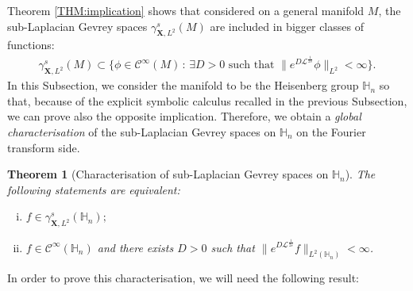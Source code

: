 \documentclass[12pt,oneside,a4paper]{book}
\numberwithin{equation}{section}     %
\theoremstyle{plain}
\newtheorem{theorem}{Theorem}[section]
\theoremstyle{definition}
\newcommand{\slp}{{\mathcal L}}
\begin{document}
Theorem \ref{THM:implication} shows that considered on a general manifold $M$, the sub-Laplacian Gevrey spaces $\gamma^s_{\mathbf{X},L^2}(M)$ are included in bigger classes of functions:
\begin{align*}
\gamma^s_{\mathbf{X},L^2}(M)\subset\big\{\phi\in\mathcal C^\infty(M)\,:\,\exists D>0\text{ such that }\|e^{D\slp^{\frac{1}{2s}}}\phi\|_{L^2}<\infty\big\}.
\end{align*}
In this Subsection, we consider the manifold to be the Heisenberg group $\mathbb H_n$ so that, because of the explicit symbolic calculus recalled in the previous Subsection, we can prove also the opposite implication. Therefore, we obtain a \textit{global characterisation} of the sub-Laplacian Gevrey spaces on $\mathbb H_n$ on the Fourier transform side.

\begin{theorem}[Characterisation of sub-Laplacian Gevrey spaces on $\mathbb H_n$]
	\label{THM:Heis}
	The following statements are equivalent:
	\begin{enumerate}[i.]
		\item $f\in \gamma^s_{\mathbf{X},L^2}(\mathbb H_n);$
		\item $f\in\mathcal C^\infty (\mathbb H_n)$ and there exists $D>0$ such that $\|e^{D\slp^{\frac{1}{2s}}} f\|_{L^2(\mathbb H_n)}<\infty$.
	\end{enumerate}
\end{theorem}

In order to prove this characterisation, we will need the following result:
\end{document}
